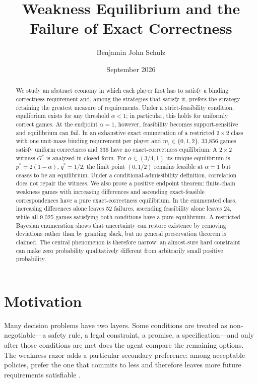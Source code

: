 \documentclass[11pt]{article}
\title{Weakness Equilibrium and the Failure of Exact Correctness}
\author{Benjamin John Schulz}
\date{September 2026}
\theoremstyle{definition}
\begin{document}
\maketitle

\begin{abstract}
We study an abstract economy in which each player first has to satisfy a binding correctness requirement and, among the strategies that satisfy it, prefers the strategy retaining the greatest measure of requirements. Under a strict-feasibility condition, equilibrium exists for any threshold $\alpha<1$; in particular, this holds for uniformly correct games. At the endpoint $\alpha=1$, however, feasibility becomes support-sensitive and equilibrium can fail. In an exhaustive exact enumeration of a restricted $2\times2$ class with one unit-mass binding requirement per player and $m_i\in\{0,1,2\}$, 33,856 games satisfy uniform correctness and 336 have no exact-correctness equilibrium. A $2\times2$ witness $G^*$ is analysed in closed form. For $\alpha\in(3/4,1)$ its unique equilibrium is $p^*=2(1-\alpha)$, $q^*=1/2$; the limit point $(0,1/2)$ remains feasible at $\alpha=1$ but ceases to be an equilibrium. Under a conditional-admissibility definition, correlation does not repair the witness. We also prove a positive endpoint theorem: finite-chain weakness games with increasing differences and ascending exact-feasible correspondences have a pure exact-correctness equilibrium. In the enumerated class, increasing differences alone leaves 52 failures, ascending feasibility alone leaves 24, while all 9,025 games satisfying both conditions have a pure equilibrium. A restricted Bayesian enumeration shows that uncertainty can restore existence by removing deviations rather than by granting slack, but no general preservation theorem is claimed. The central phenomenon is therefore narrow: an almost-sure hard constraint can make zero probability qualitatively different from arbitrarily small positive probability.
\end{abstract}

\section{Motivation}
Many decision problems have two layers. Some conditions are treated as non-negotiable---a safety rule, a legal constraint, a promise, a specification---and only after those conditions are met does the agent compare the remaining options. The weakness razor adds a particular secondary preference: among acceptable policies, prefer the one that commits to less and therefore leaves more future requirements satisfiable \cite{bennett2023,bennett2025}.
\end{document}
